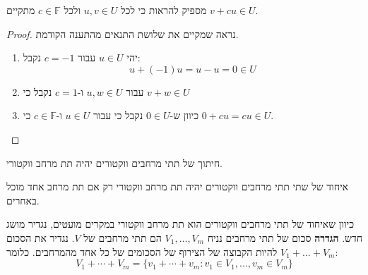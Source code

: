 \documentclass{tstextbook}
\begin{document}
\begin{proposition}
מספיק להראות כי לכל \(u,v \in U\) ולכל \(c \in \mathbb{F}\) מתקיים \(v+cu \in U\). 

\end{proposition}
\begin{proof}
נראה שמקיים את שלושת התנאים מהתענה הקודמת.

  \begin{enumerate}
    \item יהי \(u \in U\) עבור \(c = -1\) נקבל: 
$$u+(-1)u=u-u=0 \in U$$


    \item עבור \(u,w \in U\) ו-\(c=1\) נקבל כי \(v+w \in U\)


    \item כיוון ש-\(0 \in U\) נקבל כי עבור \(u \in U\) ו-\(c \in \mathbb{F}\) כי \(0+cu =cu \in U\). 


  \end{enumerate}
\end{proof}
\begin{proposition}
חיתוך של תתי מרחבים ווקטורים יהיה תת מרחב ווקטורי.

\end{proposition}
\begin{proposition}
איחוד של שתי תתי מרחבים ווקטורים יהיה תת מרחב ווקטורי רק אם תת מרחב אחד מוכל באחרים.

\end{proposition}
כיוון שאיחוד של תתי מרחבים ווקטורים הוא תת מרחב ווקטורי במקרים מועטים, נגדיר מושג חדש.
\textbf{הגדרה} סכום של תתי מרחבים
נניח \(V_{1},\dots,V_{m}\) הם תתי מרחבים של \(V\). נגדיר את הסכום \(V_{1}+\dots+V_{m}\) להיות הקבוצה של הצירוף של הסכומים של כל אחד מהמרחבים. כלומר:
$$V_{1}+\cdots+V_{m}=\{v_{1}+\cdots+v_{m}:v_{1}\in V_{1},...,v_{m}\in V_{m}\}$$
\end{document}
